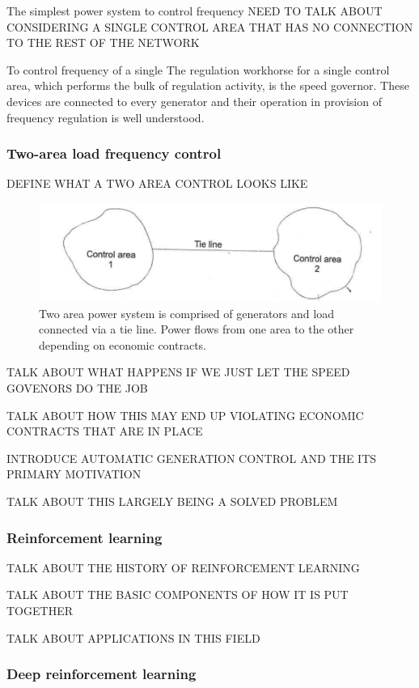 \documentclass[12pt, a4paper]{article}
\begin{document}
The simplest power system to control frequency 
NEED TO TALK ABOUT CONSIDERING A SINGLE CONTROL AREA THAT HAS NO CONNECTION TO THE REST OF THE NETWORK

To control frequency of a single The regulation workhorse for a single control area, which performs the bulk of regulation activity, is the speed governor. These devices are connected to every generator and their operation in provision of frequency regulation is well understood.

\subsubsection{Two-area load frequency control}

DEFINE WHAT A TWO AREA CONTROL LOOKS LIKE

\begin{figure}[h]
	\centering
	\includegraphics[scale=0.7]{two_area_system}
	\caption{Two area power system is comprised of generators and load connected via a tie line. Power flows from one area to the other depending on economic contracts.}
\end{figure}

TALK ABOUT WHAT HAPPENS IF WE JUST LET THE SPEED GOVENORS DO THE JOB

TALK ABOUT HOW THIS MAY END UP VIOLATING ECONOMIC CONTRACTS THAT ARE IN PLACE

INTRODUCE AUTOMATIC GENERATION CONTROL AND THE ITS PRIMARY MOTIVATION

TALK ABOUT THIS LARGELY BEING A SOLVED PROBLEM

\subsubsection{Reinforcement learning}

TALK ABOUT THE HISTORY OF REINFORCEMENT LEARNING

TALK ABOUT THE BASIC COMPONENTS OF HOW IT IS PUT TOGETHER

TALK ABOUT APPLICATIONS IN THIS FIELD

\subsubsection{Deep reinforcement learning}
\end{document}
